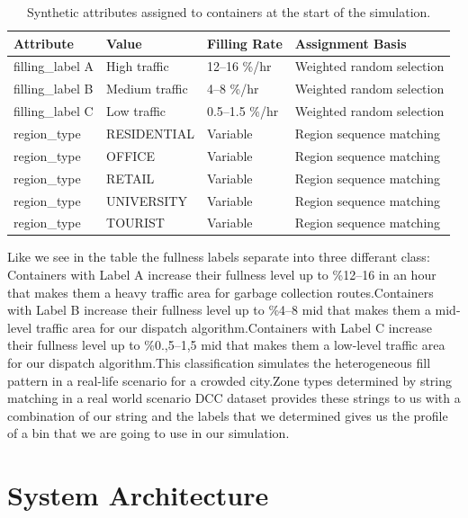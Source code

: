 \documentclass[12pt,a4paper]{report}
\begin{document}
\begin{table}[H]
\centering
\caption{Synthetic attributes assigned to containers at the start of the simulation.}
\label{tab:bin_attrs}
\begin{tabular}{llll}
\toprule
\textbf{Attribute} & \textbf{Value} & \textbf{Filling Rate} & \textbf{Assignment Basis} \\
\midrule
filling\_label A & High traffic   & 12--16 \%/hr   & Weighted random selection \\
filling\_label B & Medium traffic & 4--8 \%/hr     & Weighted random selection \\
filling\_label C & Low traffic    & 0.5--1.5 \%/hr & Weighted random selection \\
region\_type     & RESIDENTIAL    & Variable       & Region sequence matching \\
region\_type     & OFFICE         & Variable       & Region sequence matching \\
region\_type     & RETAIL         & Variable       & Region sequence matching \\
region\_type     & UNIVERSITY     & Variable       & Region sequence matching \\
region\_type     & TOURIST        & Variable       & Region sequence matching \\
\bottomrule
\end{tabular}
\end{table}

\indent Like we see in the table the fullness labels separate into three differant class: Containers with Label A increase their fullness level up to \%12--16  in an hour that makes them a heavy traffic area for garbage collection routes.Containers with Label B increase their fullness level up to \%4--8 mid  that makes them a mid-level traffic area for our dispatch algorithm.Containers with Label C increase their fullness level up to \%0.,5--1,5 mid  that makes them a low-level traffic area for our dispatch algorithm.This classification simulates the heterogeneous fill pattern in a real-life scenario for a crowded city.Zone types determined by string matching in a real world scenario DCC dataset provides these strings to us with a combination of our string and the labels that we determined gives us the profile of  a bin that we are going to use in our simulation.

\section{System Architecture}
\end{document}
